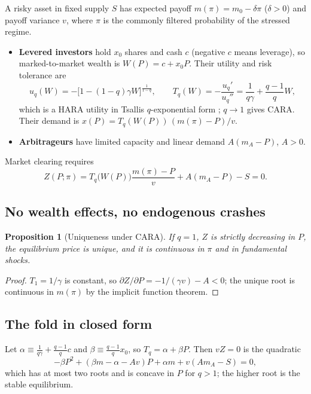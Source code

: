 \documentclass[11pt,a4paper]{article}
\newtheorem{proposition}{Proposition}
\theoremstyle{remark}
\begin{document}
A risky asset in fixed supply $S$ has expected payoff $m(\pi)=m_0-\delta\pi$ ($\delta>0$)
and payoff variance $v$, where $\pi$ is the commonly filtered probability of the stressed
regime.
\begin{itemize}[leftmargin=*]
\item \textbf{Levered investors} hold $x_0$ shares and cash $c$ (negative $c$ means
leverage), so marked-to-market wealth is $W(P)=c+x_0P$. Their utility and risk tolerance
are
\begin{equation}
u_q(W)=-\big[1-(1-q)\gamma W\big]^{\frac{1}{1-q}},\qquad
T_q(W)=-\frac{u_q'}{u_q''}=\frac{1}{q\gamma}+\frac{q-1}{q}W,
\end{equation}
which is a HARA utility in Tsallis $q$-exponential form \citep{Tsallis1988,Tsallis2009};
$q\to1$ gives CARA. Their demand is $x(P)=T_q(W(P))\,(m(\pi)-P)/v$.
\item \textbf{Arbitrageurs} have limited capacity and linear demand $A(m_A-P)$, $A>0$.
\end{itemize}
Market clearing requires
\begin{equation}
Z(P;\pi)=T_q\big(W(P)\big)\frac{m(\pi)-P}{v}+A(m_A-P)-S=0 .
\end{equation}

\subsection{No wealth effects, no endogenous crashes}

\begin{proposition}[Uniqueness under CARA]\label{prop:cara}
If $q=1$, $Z$ is strictly decreasing in $P$, the equilibrium price is unique, and it is
continuous in $\pi$ and in fundamental shocks.
\end{proposition}
\begin{proof}
$T_1=1/\gamma$ is constant, so $\partial Z/\partial P=-1/(\gamma v)-A<0$; the unique root is
continuous in $m(\pi)$ by the implicit function theorem.
\end{proof}

\subsection{The fold in closed form}

Let $\alpha\equiv\frac{1}{q\gamma}+\frac{q-1}{q}c$ and $\beta\equiv\frac{q-1}{q}x_0$, so
$T_q=\alpha+\beta P$. Then $vZ=0$ is the quadratic
\begin{equation}
-\beta P^2+(\beta m-\alpha-Av)P+\alpha m+v(Am_A-S)=0,
\end{equation}
which has at most two roots and is concave in $P$ for $q>1$; the higher root is the stable
equilibrium.
\end{document}
